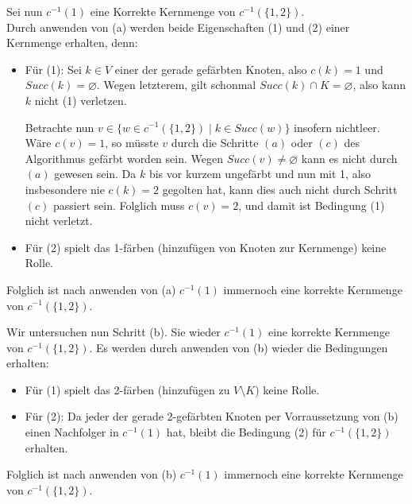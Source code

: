 \documentclass[a4paper,graphics,11pt]{article}
\begin{document}
Sei nun $c^{-1}(1)$ eine Korrekte Kernmenge von $c^{-1}(\{1,2\})$.\\
Durch anwenden von (a) werden beide Eigenschaften (1) und (2)
einer Kernmenge erhalten, denn:
\begin{itemize}
    \item Für (1): Sei $k \in V$ einer der gerade gefärbten Knoten, also $c(k) = 1$ und $Succ(k) = \varnothing$.
        Wegen letzterem, gilt schonmal $Succ(k) \cap K = \varnothing$, also kann $k$ nicht (1) verletzen.

        Betrachte nun $v \in \{w \in c^{-1}(\{1,2\}) \mid k \in Succ(w)\}$ insofern nichtleer. Wäre $c(v) = 1$, so müsste
        $v$ durch die Schritte $(a)$ oder $(c)$ des Algorithmus gefärbt worden sein.
        Wegen $Succ(v) \neq \varnothing$ kann es nicht durch $(a)$ gewesen sein. Da $k$ bis vor kurzem
        ungefärbt und nun mit 1, also insbesondere nie $c(k) = 2$ gegolten hat, kann dies auch nicht
        durch Schritt $(c)$ passiert sein.
        Folglich muss $c(v) = 2$, und damit ist Bedingung (1) nicht verletzt.

    \item Für (2) spielt das 1-färben (hinzufügen von Knoten zur Kernmenge) keine Rolle.
\end{itemize}
Folglich ist nach anwenden von (a) $c^{-1}(1)$ immernoch eine korrekte Kernmenge von $c^{-1}(\{1,2\})$.

\newpage

Wir untersuchen nun Schritt (b). Sie wieder $c^{-1}(1)$ eine korrekte Kernmenge von $c^{-1}(\{1,2\})$.
Es werden durch anwenden von (b) wieder die Bedingungen erhalten:
\begin{itemize}
    \item Für (1) spielt das 2-färben (hinzufügen zu $V \setminus K$) keine Rolle.

    \item Für (2): Da jeder der gerade 2-gefärbten Knoten per Vorraussetzung von (b) einen Nachfolger in $c^{-1}(1)$ hat,
        bleibt die Bedingung (2) für $c^{-1}(\{1,2\})$ erhalten.
\end{itemize}
Folglich ist nach anwenden von (b) $c^{-1}(1)$ immernoch eine korrekte Kernmenge von $c^{-1}(\{1,2\})$.

\strut\\
\end{document}
